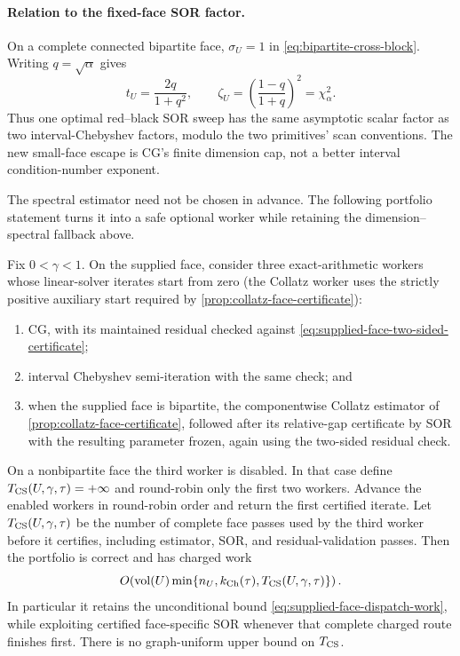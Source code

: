 \paragraph{Relation to the fixed-face SOR factor.}
On a complete connected bipartite face, $\sigma_U=1$ in
\eqref{eq:bipartite-cross-block}.  Writing $q=\sqrt\alpha$ gives
\begin{equation}
 t_U=\frac{2q}{1+q^2},
 \qquad
 \zeta_U=\left(\frac{1-q}{1+q}\right)^2=\chi_\alpha^2.
 \label{eq:supplied-face-chebyshev-sor-factor}
\end{equation}
Thus one optimal red--black SOR sweep has the same asymptotic scalar factor as
two interval-Chebyshev factors, modulo the two primitives' scan conventions.
The new small-face escape is CG's finite dimension cap, not a better interval
condition-number exponent.

The spectral estimator need not be chosen in advance.  The following
portfolio statement turns it into a safe optional worker while retaining the
dimension--spectral fallback above.

\begin{proposition}
\label{prop:supplied-face-portfolio}
Fix $0<\gamma<1$.  On the supplied face, consider three exact-arithmetic
workers whose linear-solver iterates start from zero (the Collatz worker uses
the strictly positive auxiliary start required by
\cref{prop:collatz-face-certificate}):
\begin{enumerate}
\item CG, with its maintained residual checked against
  \eqref{eq:supplied-face-two-sided-certificate};
\item interval Chebyshev semi-iteration with the same check; and
\item when the supplied face is bipartite, the componentwise Collatz estimator of
  \cref{prop:collatz-face-certificate}, followed after its relative-gap
  certificate by SOR with the resulting parameter frozen, again using the
  two-sided residual check.
\end{enumerate}
On a nonbipartite face the third worker is disabled.  In that case define
$T_{\rm CS}(U,\gamma,\tau)=+\infty$ and round-robin only the first two
workers.
Advance the enabled workers in round-robin order and return the first certified
iterate.  Let $T_{\rm CS}(U,\gamma,\tau)$ be the number of complete face
passes used by the third worker before it certifies, including estimator,
SOR, and residual-validation passes.  Then the portfolio is correct and has
charged work
\begin{equation}
 O\!\left(\operatorname{vol}(U)
 \min\{n_U,k_{\rm Ch}(\tau),T_{\rm CS}(U,\gamma,\tau)\}\right).
 \label{eq:supplied-face-portfolio-work}
\end{equation}
In particular it retains the unconditional bound
\eqref{eq:supplied-face-dispatch-work}, while exploiting certified
face-specific SOR whenever that complete charged route finishes first.
There is no graph-uniform upper bound on $T_{\rm CS}$.
\end{proposition}

